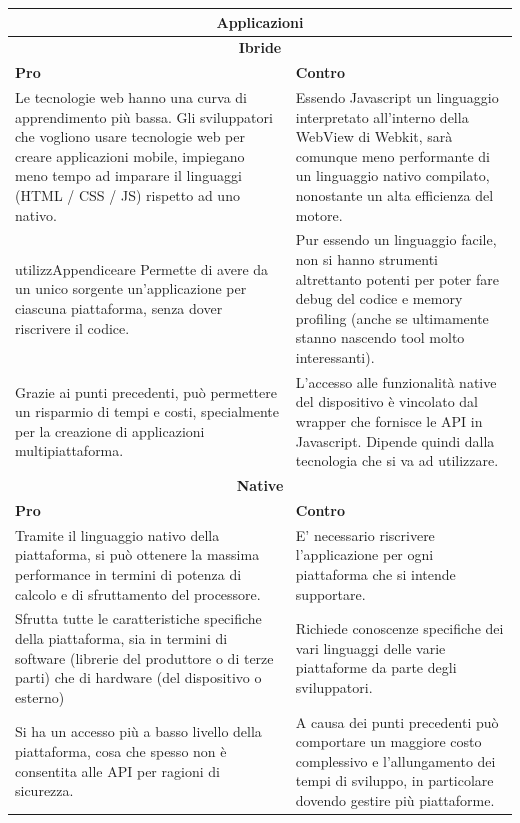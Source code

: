\begin{table}[h]
	\centering
	\begin{tabular}{|p{7.5cm}p{7.5cm}|}
		\hline
		\multicolumn{2}{|c|}{\textbf{Applicazioni}} \\ \hline
		\multicolumn{2}{|c|}{\cellcolor{black!10}\textbf{Ibride}}	  \\ \hline
  \cellcolor{green!35}
  \textbf{Pro} 
&
  \cellcolor{red!55}
  \textbf{Contro} 
\\ \hline
  \cellcolor{blue!25} 
  Le tecnologie web hanno una curva di apprendimento più bassa. Gli sviluppatori che vogliono usare tecnologie web per creare applicazioni mobile, impiegano meno tempo ad imparare il linguaggi (HTML / CSS / JS) rispetto ad uno nativo.
&
  \cellcolor{blue!10}
  Essendo Javascript un linguaggio interpretato all'interno della WebView di Webkit, sarà comunque meno performante di un linguaggio nativo compilato, nonostante un alta efficienza del motore. 
\\utilizzAppendiceare
  \cellcolor{blue!10}
  Permette di avere da un unico sorgente un'applicazione per ciascuna piattaforma, senza dover riscrivere il codice.
&
  \cellcolor{blue!25}
  Pur essendo un linguaggio facile, non si hanno strumenti altrettanto potenti 
  per poter fare debug del codice e memory profiling (anche se ultimamente stanno nascendo tool molto interessanti).
\\
  \cellcolor{blue!25}
  Grazie ai punti precedenti, può permettere un risparmio di tempi e costi, specialmente per la creazione di applicazioni multipiattaforma.
&
  \cellcolor{blue!10}
  L'accesso alle funzionalità native del dispositivo è vincolato dal wrapper che fornisce le API in Javascript. Dipende quindi dalla tecnologia che si va ad utilizzare.
\\\hline		
        \multicolumn{2}{|c|}{\cellcolor{black!10}\textbf{Native}} \\ \hline
  \cellcolor{green!35}
  \textbf{Pro} 
& 
  \cellcolor{red!55}
  \textbf{Contro} 
\\ \hline
  \cellcolor{blue!10}
  Tramite il linguaggio nativo della piattaforma, si può ottenere la massima performance in termini di potenza di calcolo e di sfruttamento del processore. 
& 
  \cellcolor{blue!25}
  E’ necessario riscrivere l'applicazione per ogni piattaforma che si intende supportare.
\\
  \cellcolor{blue!25}
  Sfrutta tutte le caratteristiche specifiche della piattaforma, sia in termini di software (librerie del produttore o di terze parti) che di hardware (del dispositivo o esterno)
&
  \cellcolor{blue!10}
  Richiede conoscenze specifiche dei vari linguaggi delle varie piattaforme da parte degli sviluppatori.
\\
  \cellcolor{blue!10}
  Si ha un accesso più a basso livello della piattaforma, cosa che spesso non è consentita alle API per ragioni di sicurezza.
&
  \cellcolor{blue!25}
  A causa dei punti precedenti può comportare un maggiore costo complessivo e l'allungamento dei tempi di sviluppo, in particolare dovendo gestire più piattaforme.
\\ \hline
 

\end{tabular}
\end{table}
